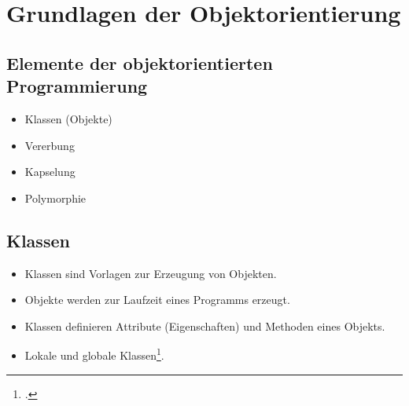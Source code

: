 \section{Grundlagen der Objektorientierung}

\subsection{Elemente der objektorientierten Programmierung}
\begin{itemize}
    \item Klassen (Objekte)
    \item Vererbung
    \item Kapselung
    \item Polymorphie
\end{itemize}

\subsection{Klassen}
\begin{itemize}
    \item Klassen sind Vorlagen zur Erzeugung von Objekten.
    \item Objekte werden zur Laufzeit eines Programms erzeugt.
    \item Klassen definieren Attribute (Eigenschaften) und Methoden eines Objekts.
    \item Lokale und globale Klassen\footcite[Vgl.][S. 4]{zaidiSAPABAPObjects2019}. 
\end{itemize}

\newpage